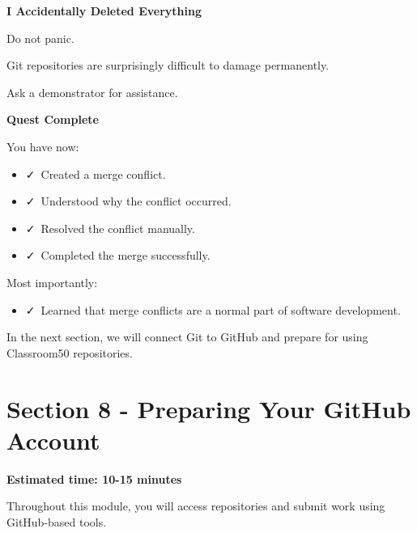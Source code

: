 \documentclass{csc2059practical}
\begin{document}
\begin{commonerror}
\textbf{I Accidentally Deleted Everything}\par
\medskip

Do not panic.


Git repositories are surprisingly difficult to damage permanently.


Ask a demonstrator for assistance.


\end{commonerror}
\begin{wrapupbox}
\textbf{Quest Complete}\par
\medskip

You have now:


\begin{itemize}
  \item \faCheck\ Created a merge conflict.
\end{itemize}

\begin{itemize}
  \item \faCheck\ Understood why the conflict occurred.
\end{itemize}

\begin{itemize}
  \item \faCheck\ Resolved the conflict manually.
\end{itemize}

\begin{itemize}
  \item \faCheck\ Completed the merge successfully.
\end{itemize}

Most importantly:


\begin{itemize}
  \item \faCheck\ Learned that merge conflicts are a normal part of software development.
\end{itemize}

In the next section, we will connect Git to GitHub and prepare for using Classroom50 repositories.


\end{wrapupbox}

\clearpage
\section{Section 8 - Preparing Your GitHub Account}
\begin{infobox}
\textbf{Estimated time: 10-15 minutes}
\end{infobox}
Throughout this module, you will access repositories and submit work using GitHub-based tools.
\end{document}
